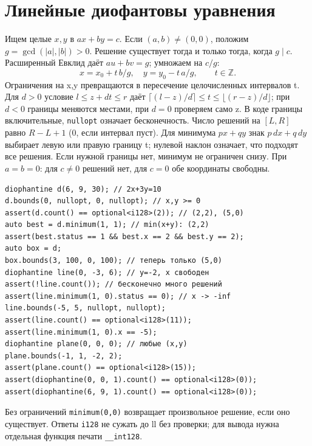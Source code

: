 \section{Линейные диофантовы уравнения}
Ищем целые $x,y$ в $ax+by=c$. Если $(a,b)\ne(0,0)$, положим
$g=\gcd(|a|,|b|)>0$. Решение существует тогда и только тогда, когда
$g\mid c$. Расширенный Евклид даёт $au+bv=g$; умножаем на $c/g$:
\[ x=x_0+t\,b/g,\quad y=y_0-t\,a/g,\qquad t\in\mathbb Z. \]
Ограничения на x,y превращаются в пересечение целочисленных интервалов t.
Для $d>0$ условие $l\le z+dt\le r$ даёт
$\lceil(l-z)/d\rceil\le t\le\lfloor(r-z)/d\rfloor$;
при $d<0$ границы меняются местами, при $d=0$ проверяем само z.
В коде границы включительные, \texttt{nullopt} означает бесконечность.
Число решений на $[L,R]$ равно $R-L+1$ (0, если интервал пуст).
Для минимума $px+qy$ знак $p\,dx+q\,dy$ выбирает левую или правую
границу t; нулевой наклон означает, что подходят все решения.
Если нужной границы нет, минимум не ограничен снизу.
При $a=b=0$: для $c\ne0$ решений нет, для $c=0$ обе координаты свободны.

\begin{lstlisting}
diophantine d(6, 9, 30); // 2x+3y=10
d.bounds(0, nullopt, 0, nullopt); // x,y >= 0
assert(d.count() == optional<i128>(2)); // (2,2), (5,0)
auto best = d.minimum(1, 1); // min(x+y): (2,2)
assert(best.status == 1 && best.x == 2 && best.y == 2);
auto box = d;
box.bounds(3, 100, 0, 100); // теперь только (5,0)
diophantine line(0, -3, 6); // y=-2, x свободен
assert(!line.count()); // бесконечно много решений
assert(line.minimum(1, 0).status == 0); // x -> -inf
line.bounds(-5, 5, nullopt, nullopt);
assert(line.count() == optional<i128>(11));
assert(line.minimum(1, 0).x == -5);
diophantine plane(0, 0, 0); // любые (x,y)
plane.bounds(-1, 1, -2, 2);
assert(plane.count() == optional<i128>(15));
assert(diophantine(0, 0, 1).count() == optional<i128>(0));
assert(diophantine(6, 9, 1).count() == optional<i128>(0));
\end{lstlisting}
Без ограничений \texttt{minimum(0,0)} возвращает произвольное решение,
если оно существует. Ответы \texttt{i128} не сужать до ll без проверки;
для вывода нужна отдельная функция печати \texttt{\_\_int128}.

